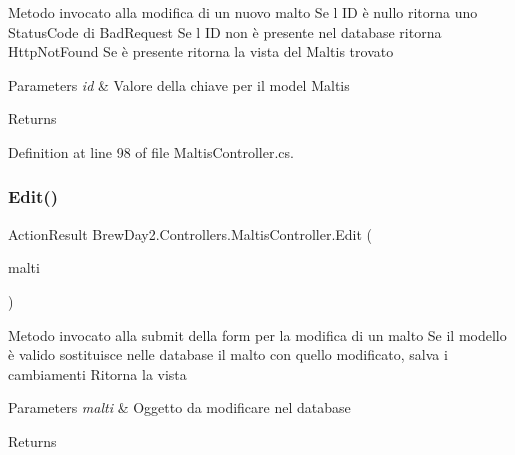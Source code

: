 Metodo invocato alla modifica di un nuovo malto Se l\textquotesingle{} ID è nullo ritorna uno Status\+Code di Bad\+Request Se l\textquotesingle{} ID non è presente nel database ritorna Http\+Not\+Found Se è presente ritorna la vista del Maltis trovato 


\begin{DoxyParams}{Parameters}
{\em id} & Valore della chiave per il model Maltis\\
\hline
\end{DoxyParams}
\begin{DoxyReturn}{Returns}

\end{DoxyReturn}


Definition at line 98 of file Maltis\+Controller.\+cs.

\mbox{\label{class_brew_day2_1_1_controllers_1_1_maltis_controller_a916ce2dd1063485b443a3bc51f8101f7}} 
\subsubsection{\texorpdfstring{Edit()}{Edit()}\hspace{0.1cm}{\footnotesize\ttfamily [2/2]}}
{\footnotesize\ttfamily Action\+Result Brew\+Day2.\+Controllers.\+Maltis\+Controller.\+Edit (\begin{DoxyParamCaption}\item[{\mbox{[}\+Bind(\+Include = \char`\"{}\+Id,\+Nome,\+Produttore,\+Descrizione,\+Prezzo\char`\"{})\mbox{]} \mbox{\hyperlink{class_brew_day2_1_1_models_1_1_malti}{Malti}}}]{malti }\end{DoxyParamCaption})}



Metodo invocato alla submit della form per la modifica di un malto Se il modello è valido sostituisce nelle database il malto con quello modificato, salva i cambiamenti Ritorna la vista 


\begin{DoxyParams}{Parameters}
{\em malti} & Oggetto da modificare nel database\\
\hline
\end{DoxyParams}
\begin{DoxyReturn}{Returns}

\end{DoxyReturn}



